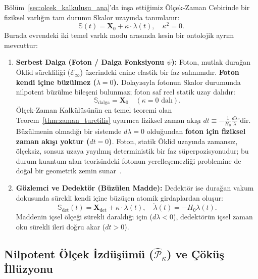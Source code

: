 Bölüm~\ref{sec:olcek_kalkulusu_ana}'da inşa ettiğimiz Ölçek-Zaman Cebirinde bir fiziksel varlığın tam durumu Skalor uzayında tanımlanır:
\begin{equation}
    \mathbb{S}(t) = \mathbf{X}_0 + \kappa \cdot \lambda(t), \quad \kappa^2 = 0.
    \label{eq:skalor_durum_olcum}
\end{equation}
Burada evrendeki iki temel varlık modu arasında kesin bir ontolojik ayrım mevcuttur:
\begin{enumerate}
    \item \textbf{Serbest Dalga (Foton / Dalga Fonksiyonu $\psi$):} Foton, mutlak durağan Öklid sürekliliği ($\mathcal{E}_\infty$) üzerindeki enine elastik bir faz salınımıdır. \textbf{Foton kendi içine büzülmez ($\dot{\lambda} = 0$).} Dolayısıyla fotonun Skalor durumunda nilpotent büzülme bileşeni bulunmaz; foton saf reel statik uzay dalıdır:
          \begin{equation}
              \mathbb{S}_{\mathrm{dalga}} = \mathbf{X}_0 \quad (\kappa = 0 \text{ dalı}).
              \label{eq:foton_skalor}
          \end{equation}
          Ölçek-Zaman Kalkülüsünün en temel teoremi olan Teorem~\ref{thm:zaman_turetilis} uyarınca fiziksel zaman akışı $dt \equiv -\frac{1}{H_0}\frac{d\lambda}{\lambda}$'dir. Büzülmenin olmadığı bir sistemde $d\lambda = 0$ olduğundan \textbf{foton için fiziksel zaman akışı yoktur ($dt = 0$)}. Foton, statik Öklid uzayında zamansız, ölçeksiz, sonsuz uzaya yayılmış deterministik bir faz süperpozisyonudur; bu durum kuantum alan teorisindeki fotonun yerelleşemezliği problemine de doğal bir geometrik zemin sunar~\cite{paul1982}.
    \item \textbf{Gözlemci ve Dedektör (Büzülen Madde):} Dedektör ise durağan vakum dokusunda sürekli kendi içine büzüşen atomik girdaplardan oluşur:
          \begin{equation}
              \mathbb{S}_{\mathrm{det}}(t) = \mathbf{X}_{\mathrm{det}} + \kappa \cdot \lambda(t), \quad \dot{\lambda}(t) = -H_0 \lambda(t).
              \label{eq:dedektor_skalor}
          \end{equation}
          Maddenin içsel ölçeği sürekli daraldığı için ($d\lambda < 0$), dedektörün içsel zaman oku sürekli ileri doğru akar ($dt > 0$).
\end{enumerate}

\subsection{Nilpotent Ölçek İzdüşümü (\texorpdfstring{$\hat{\mathcal{P}}_\kappa$}{P_kappa}) ve Çöküş İllüzyonu}
\label{sec:nilpotent_izdusum}


